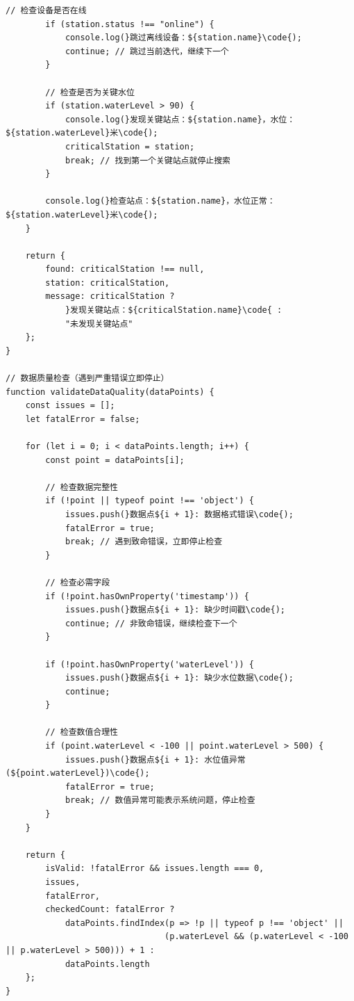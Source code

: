 {\begin{lstlisting}[style=javascript]
        // 检查设备是否在线
        if (station.status !== "online") {
            console.log(}跳过离线设备：${station.name}\code{);
            continue; // 跳过当前迭代，继续下一个
        }
        
        // 检查是否为关键水位
        if (station.waterLevel > 90) {
            console.log(}发现关键站点：${station.name}，水位：${station.waterLevel}米\code{);
            criticalStation = station;
            break; // 找到第一个关键站点就停止搜索
        }
        
        console.log(}检查站点：${station.name}，水位正常：${station.waterLevel}米\code{);
    }
    
    return {
        found: criticalStation !== null,
        station: criticalStation,
        message: criticalStation ? 
            }发现关键站点：${criticalStation.name}\code{ : 
            "未发现关键站点"
    };
}

// 数据质量检查（遇到严重错误立即停止）
function validateDataQuality(dataPoints) {
    const issues = [];
    let fatalError = false;
    
    for (let i = 0; i < dataPoints.length; i++) {
        const point = dataPoints[i];
        
        // 检查数据完整性
        if (!point || typeof point !== 'object') {
            issues.push(}数据点${i + 1}: 数据格式错误\code{);
            fatalError = true;
            break; // 遇到致命错误，立即停止检查
        }
        
        // 检查必需字段
        if (!point.hasOwnProperty('timestamp')) {
            issues.push(}数据点${i + 1}: 缺少时间戳\code{);
            continue; // 非致命错误，继续检查下一个
        }
        
        if (!point.hasOwnProperty('waterLevel')) {
            issues.push(}数据点${i + 1}: 缺少水位数据\code{);
            continue;
        }
        
        // 检查数值合理性
        if (point.waterLevel < -100 || point.waterLevel > 500) {
            issues.push(}数据点${i + 1}: 水位值异常 (${point.waterLevel})\code{);
            fatalError = true;
            break; // 数值异常可能表示系统问题，停止检查
        }
    }
    
    return {
        isValid: !fatalError && issues.length === 0,
        issues,
        fatalError,
        checkedCount: fatalError ? 
            dataPoints.findIndex(p => !p || typeof p !== 'object' || 
                                (p.waterLevel && (p.waterLevel < -100 || p.waterLevel > 500))) + 1 :
            dataPoints.length
    };
}
\end{lstlisting}

}
